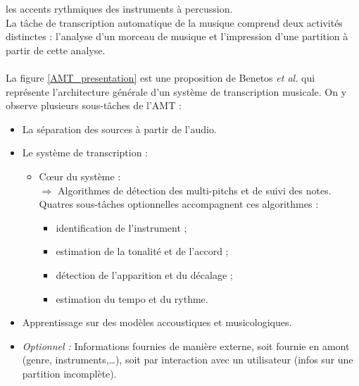 les accents rythmiques des instruments à percussion.\\
La tâche de transcription automatique de la musique comprend deux activités
distinctes : l'analyse d'un morceau de musique et l'impression d'une partition
à partir de cette analyse.\\\\
La figure \ref{AMT_presentation} est une proposition de Benetos \textit{et al.}
\cite{future_directions} qui représente l'architecture générale d'un système de
transcription musicale. On y observe plusieurs sous-tâches de l’AMT :
\begin{itemize}
	\item La séparation des sources à partir de l’audio.
	\item Le système de transcription :
	\begin{itemize}
		\item Cœur du système :\\
		$\Rightarrow$ Algorithmes de détection des multi-pitchs et de suivi des \tab notes.\\
		Quatres sous-tâches optionnelles accompagnent ces algorithmes :
		\begin{itemize}
			\item identification de l'instrument ;
			\item estimation de la tonalité et de l'accord ;
			\item détection de l'apparition et du décalage ;
			\item estimation du tempo et du rythme.
		\end{itemize}
	\end{itemize}
	\item Apprentissage sur des modèles accoustiques et musicologiques.
	\item \textit{Optionnel :} Informations fournies de manière externe, soit
        fournie en amont (genre, instruments,…), soit par interaction avec un
        utilisateur (infos sur une partition incomplète).
\end{itemize}
